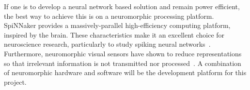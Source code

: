 If one is to develop a neural network based solution and remain power efficient, the best way to achieve this is on a neuromorphic processing platform. SpiNNaker provides a massively-parallel high-efficiency computing platform, inspired by the brain. These characteristics make it an excellent choice for neuroscience research, particularly to study spiking neural networks~\cite{furber2014spinnaker}. Furthermore, neuromorphic visual sensors have shown to reduce representations so that irrelevant information is not transmitted nor processed~\cite{aer-retina-bernabe,dvs-zurich}. A combination of neuromorphic hardware and software will be the development platform for this project.
